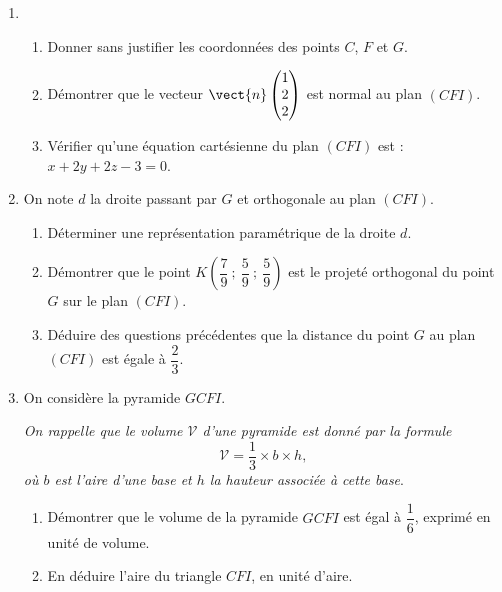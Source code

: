 \begin{enumerate}
	\item 
	\begin{enumerate}
		\item Donner sans justifier les coordonnées des points $C$, $F$ et $G$.
		\item Démontrer que le vecteur $\vect{n}\begin{pmatrix}1\\2\\2\end{pmatrix}$ est normal au plan $(CFI)$.
		\item Vérifier qu'une équation cartésienne du plan $(CFI)$ est : $x + 2y + 2z - 3 = 0$.
	\end{enumerate}	
	\item  On note $d$ la droite passant par $G$ et orthogonale au plan $(CFI)$.
	\begin{enumerate}
		\item Déterminer une représentation paramétrique de la droite $d$.
		\item Démontrer que le point $K\left(\dfrac79~;~\dfrac59~;~\dfrac59\right)$ est le projeté orthogonal du point $G$ sur le plan $(CFI)$.
		\item Déduire des questions précédentes que la distance du point $G$ au plan $(CFI)$ est égale à $\dfrac23$.
	\end{enumerate}
	\item On considère la pyramide $GCFI$.
	
	\emph{On rappelle que le volume $\mathcal{V}$ d'une pyramide est donné par la formule} \[\mathcal{V} = \frac13 \times b \times h,\]
	\emph{où $b$ est l'aire d'une base et $h$ la hauteur associée à cette base}.
	\begin{enumerate}
		\item Démontrer que le volume de la pyramide $GCFI$ est égal à $\dfrac16$, exprimé en unité de volume.
		\item En déduire l'aire du triangle $CFI$, en unité d'aire.
	\end{enumerate}
\end{enumerate}